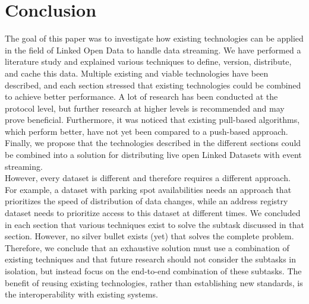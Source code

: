 \section{Conclusion}
The goal of this paper was to investigate how existing technologies can be applied in the field of Linked Open Data to handle data streaming. We have performed a literature study and explained various techniques to define, version, distribute, and cache this data. Multiple existing and viable technologies have been described, and each section stressed that existing technologies could be combined to achieve better performance. A lot of research has been conducted at the protocol level, but further research at higher levels is recommended and may prove beneficial. Furthermore, it was noticed that existing pull-based algorithms, which perform better, have not yet been compared to a push-based approach. Finally, we propose that the technologies described in the different sections could be combined into a solution for distributing live open Linked Datasets with event streaming.\\

\noindent However, every dataset is different and therefore requires a different approach. For example, a dataset with parking spot availabilities needs an approach that prioritizes the speed of distribution of data changes, while an address registry dataset needs to prioritize access to this dataset at different times. We concluded in each section that various techniques exist to solve the subtask discussed in that section. However, no silver bullet exists (yet) that solves the complete problem. Therefore, we conclude that an exhaustive solution must use a combination of existing techniques and that future research should not consider the subtasks in isolation, but instead focus on the end-to-end combination of these subtasks. The benefit of reusing existing technologies, rather than establishing new standards, is the interoperability with existing systems.